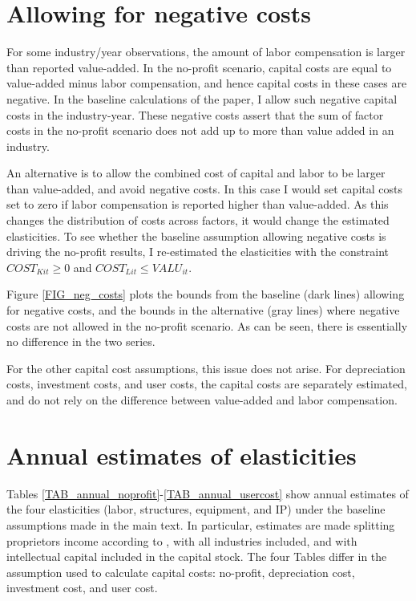\documentclass[11pt]{article}
\begin{document}
\section{Allowing for negative costs}
For some industry/year observations, the amount of labor compensation is larger than reported value-added. In the no-profit scenario, capital costs are equal to value-added minus labor compensation, and hence capital costs in these cases are negative. In the baseline calculations of the paper, I allow such negative capital costs in the industry-year. These negative costs assert that the sum of factor costs in the no-profit scenario does not add up to more than value added in an industry. 

An alternative is to allow the combined cost of capital and labor to be larger than value-added, and avoid negative costs. In this case I would set capital costs set to zero if labor compensation is reported higher than value-added. As this changes the distribution of costs across factors, it would change the estimated elasticities. To see whether the baseline assumption allowing negative costs is driving the no-profit results, I re-estimated the elasticities with the constraint $COST_{Kit} \geq 0$ and $COST_{Lit} \leq VALU_{it}$.

Figure \ref{FIG_neg_costs} plots the bounds from the baseline (dark lines) allowing for negative costs, and the bounds in the alternative (gray lines) where negative costs are not allowed in the no-profit scenario. As can be seen, there is essentially no difference in the two series.

For the other capital cost assumptions, this issue does not arise. For depreciation costs, investment costs, and user costs, the capital costs are separately estimated, and do not rely on the difference between value-added and labor compensation.

\section{Annual estimates of elasticities}
Tables \ref{TAB_annual_noprofit}-\ref{TAB_annual_usercost} show annual estimates of the four elasticities (labor, structures, equipment, and IP) under the baseline assumptions made in the main text. In particular, estimates are made splitting proprietors income according to \cite{gommerupert2004}, with all industries included, and with intellectual capital included in the capital stock. The four Tables differ in the assumption used to calculate capital costs: no-profit, depreciation cost, investment cost, and user cost. 
\end{document}

